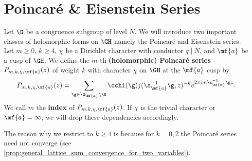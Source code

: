   \section{Poincar\'e \& Eisenstein Series}
    Let $\G$ be a congruence subgroup of level $N$. We will introduce two important classes of holomorphic forms on $\GH$ namely the Poincar\'e and Eisenstein series. Let $m \ge 0$, $k \ge 4$, $\chi$ be a Dirichlet character with conductor $q \mid N$, and $\mf{a}$ be a cusp of $\GH$. We define the $m$-th \textbf{(holomorphic) Poincar\'e series} $P_{m,k,\chi,\mf{a}}(z)$ of weight $k$ with character $\chi$ on $\GH$ at the $\mf{a}$ cusp by
    \[
      P_{m,k,\chi,\mf{a}}(z) = \sum_{\g \in \G_{\mf{a}}\backslash\G}\cchi(\g)j(\s_{\mf{a}}^{-1}\g,z)^{-k}e^{2\pi im\s_{\mf{a}}^{-1}\g z}.
    \]
    We call $m$ the \textbf{index} of $P_{m,k,\chi,\mf{a}}(z)$. If $\chi$ is the trivial character or $\mf{a} = \infty$, we will drop these dependencies accordingly. 

    \begin{remark}
      The reason why we restrict to $k \ge 4$ is because for $k = 0,2$ the Poincar\'e series need not converge (see \cref{prop:general_lattice_sum_convergence_for_two_variables}).
    \end{remark}

